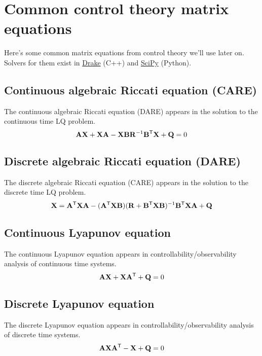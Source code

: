 \section{Common control theory matrix equations}

Here's some common matrix equations from control theory we'll use later on.
Solvers for them exist in \href{https://github.com/RobotLocomotion/drake}{Drake}
(C++) and \href{https://github.com/scipy/scipy}{SciPy} (Python).

\subsection{Continuous algebraic Riccati equation (CARE)}

The continuous algebraic Riccati equation (DARE) appears in the solution to the
continuous time LQ problem.
\begin{equation}
  \mathbf{A}\mathbf{X} + \mathbf{X}\mathbf{A} - \mathbf{X}\mathbf{B}\mathbf{R}^{-1}\mathbf{B}^\mathsf{T}\mathbf{X} +
    \mathbf{Q} = 0
\end{equation}

\subsection{Discrete algebraic Riccati equation (DARE)}

The discrete algebraic Riccati equation (CARE) appears in the solution to the
discrete time LQ problem.
\begin{equation}
  \mathbf{X} = \mathbf{A}^\mathsf{T}\mathbf{X}\mathbf{A} - (\mathbf{A}^\mathsf{T}\mathbf{X}\mathbf{B})(\mathbf{R} +
    \mathbf{B}^\mathsf{T}\mathbf{X}\mathbf{B})^{-1} \mathbf{B}^\mathsf{T}\mathbf{X}\mathbf{A} + \mathbf{Q}
\end{equation}

\subsection{Continuous Lyapunov equation}

The continuous Lyapunov equation appears in controllability/observability
analysis of continuous time systems.
\begin{equation}
  \mathbf{A}\mathbf{X} + \mathbf{X}\mathbf{A}^\mathsf{T} + \mathbf{Q} = 0
\end{equation}

\subsection{Discrete Lyapunov equation}

The discrete Lyapunov equation appears in controllability/observability analysis
of discrete time systems.
\begin{equation}
  \mathbf{A}\mathbf{X}\mathbf{A}^\mathsf{T} - \mathbf{X} + \mathbf{Q} = 0
\end{equation}
